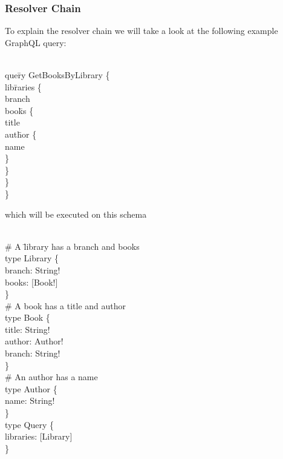 \subsubsection{Resolver Chain}
To explain the resolver chain we will take a look at the following example GraphQL query: 
\begin{exmp}
\label{ex242}
\begin{tabbing}
\\
que\=ry GetBooksByLibrary \{ \\
\> lib\=raries \{ \\
\> \> branch \\
\> \> boo\=ks \{ \\
\> \> \> title \\
\> \> \> aut\=hor \{ \\
\> \> \> \> name \\
\> \> \> \} \\
\> \> \} \\
\> \} \\
\}
\end{tabbing}
\end{exmp}
\noindent
which will be executed on this schema 
\begin{exmp}
\label{ex243}
\begin{tabbing}
\\
\# A \=library has a branch and books \\
type Library \{ \\
\> branch: String! \\
\> books: [Book!] \\
\} \\

\# A book has a title and author \\
type Book \{ \\
\> title: String! \\
\> author: Author! \\
\> branch: String! \\
\} \\

\# An author has a name \\
type Author \{ \\
\> name: String! \\
\} \\

type Query \{ \\
\> libraries: [Library] \\
\} \\
\end{tabbing}
\end{exmp}

